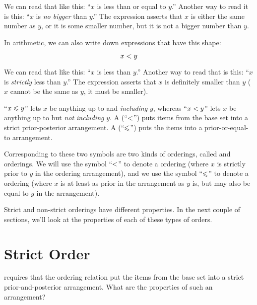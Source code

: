 \documentclass[../../../main.tex]{subfiles}
\begin{document}
We can read that like this: ``$x$ is less than or equal to $y$.'' Another way to read it is this: ``$x$ is \emph{no bigger} than $y$.'' The expression asserts that $x$ is either the same number as $y$, or it is some smaller number, but it is not a bigger number than $y$.

In arithmetic, we can also write down expressions that have this shape:

\begin{equation*}
  x \strictorder/ y
\end{equation*}

We can read that like this: ``$x$ is less than $y$.'' Another way to read that is this: ``$x$ is \emph{strictly} less than $y$.'' The expression asserts that $x$ is definitely smaller than $y$ ($x$ cannot be the same as $y$, it must be smaller).

\begin{terminology}
  ``$x \order/ y$'' lets $x$ be anything up to and \emph{including} $y$, whereas ``$x \strictorder/ y$'' lets $x$ be anything up to but \emph{not including} $y$. A  (``$\strictorder/$'') puts items from the base set into a strict prior-posterior arrangement. A  (``$\order/$'') puts the items into a prior-or-equal-to arrangement.
\end{terminology}

Corresponding to these two symbols are two kinds of orderings, called  and  orderings. We will use the symbol ``$\strictorder/$'' to denote a  ordering (where $x$ is strictly prior to $y$ in the ordering arrangement), and we use the symbol ``$\order/$'' to denote a  ordering (where $x$ is at least as prior in the arrangement as $y$ is, but may also be equal to $y$ in the arrangement).

Strict and non-strict orderings have different properties. In the next couple of sections, we'll look at the properties of each of these types of orders.


\section{Strict Order}
\label{sec:strict-order}

 requires that the ordering relation put the items from the base set into a strict prior-and-posterior arrangement. What are the properties of such an arrangement?
\end{document}
